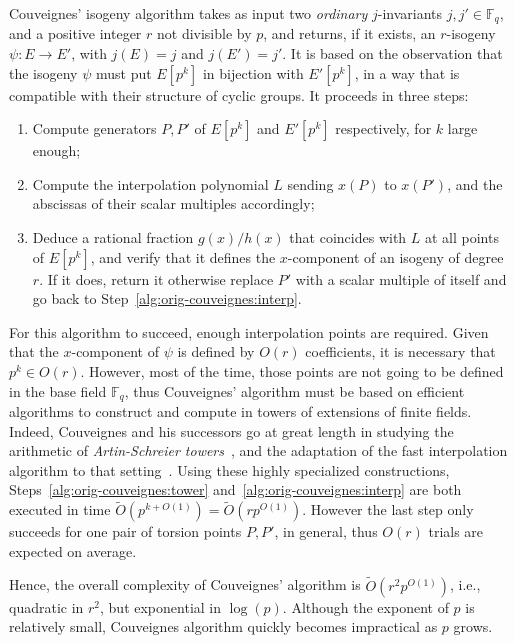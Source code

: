 \documentclass{lms}
\newcommand{\F}{\mathbb{F}}
\newcommand{\tildO}{\tilde{O}}
\begin{document}
Couveignes' isogeny algorithm takes as input two \emph{ordinary}
$j$-invariants $j,j'∈\F_q$, and a positive integer $r$ not
divisible by $p$, and returns, if it exists, an
$r$-isogeny $ψ:E\to E'$, with $j(E)=j$ and $j(E')=j'$. It is based on the observation that the
isogeny $ψ$ must put $E[p^k]$ in bijection with $E'[p^k]$, in a way
that is compatible with their structure of cyclic groups. 
It proceeds in three steps:
\begin{enumerate}
\item\label{alg:orig-couveignes:tower} Compute generators $P,P'$ of
  $E[p^k]$ and $E'[p^k]$ respectively, for $k$ large enough;
\item\label{alg:orig-couveignes:interp} Compute the interpolation
  polynomial $L$ sending $x(P)$ to $x(P')$, and the abscissas of
  their scalar multiples accordingly;
\item\label{alg:orig-couveignes:rational} Deduce a rational fraction $g(x)/h(x)$
  that coincides with $L$ at all points of $E[p^k]$, and verify that
  it defines the $x$-component of an isogeny of degree $r$. If it
  does, return it otherwise replace $P'$ with a scalar multiple of
  itself and go back to Step~\ref{alg:orig-couveignes:interp}.
\end{enumerate}

For this algorithm to succeed, enough interpolation points are
required. Given that the $x$-component of $ψ$ is defined by $O(r)$ coefficients,
it is necessary that $p^k∈O(r)$. However, most of
the time, those points are not going to be defined in the base field
$\F_q$, thus Couveignes' algorithm must be based on efficient
algorithms to construct and compute in towers of extensions of finite
fields. Indeed, Couveignes and his successors go at great length in
studying the arithmetic of \emph{Artin-Schreier
  towers}~\cite{couveignes00,df+schost12}, and the adaptation of the
fast interpolation algorithm to that setting~\cite{df10}.  Using these
highly specialized constructions,
Steps~\ref{alg:orig-couveignes:tower}
and~\ref{alg:orig-couveignes:interp} are both executed in 
time $\tildO(p^{k+O(1)})=\tildO(rp^{O(1)})$. However the last step
only succeeds for one pair of torsion points $P,P'$, in general, thus
$O(r)$ trials are expected on average.

Hence, the overall complexity of Couveignes' algorithm is
$\tildO(r^2p^{O(1)})$, i.e., quadratic in $r^2$, but exponential in
$\log(p)$. Although the exponent of $p$ is relatively small,
Couveignes algorithm quickly becomes impractical as $p$ grows.
\end{document}
